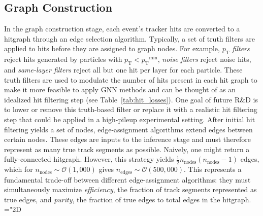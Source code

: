 \documentclass[twocolumn]{svjour3}
\newcommand{\pt}{\ensuremath{p_{\mathrm{T}}}\xspace}
\newcommand{\nnodes}{\ensuremath{n_\mathrm{nodes}\xspace}}
\newcommand{\nedges}{\ensuremath{n_\mathrm{edges}\xspace}}
\begin{document}
\subsection{Graph Construction}
\label{sec:Graph}
In the graph construction stage, each event's tracker hits are converted to a hitgraph through an edge selection algorithm. 
Typically, a set of truth filters are applied to hits before they are assigned to graph nodes. 
For example, \textit{$\pt$ filters} reject hits generated by particles with $\pt<\pt^\mathrm{min}$, \textit{noise filters} reject noise hits, and \textit{same-layer filters} reject all but one hit per layer for each particle. 
These truth filters are used to modulate the number of hits present in each hit graph to make it more feasible to apply GNN methods and can be thought of as an idealized hit filtering step (see Table~\ref{tab:hit_losses}).
One goal of future R\&D is to lower or remove this truth-based filter or replace it with a realistic hit filtering step that could be applied in a high-pileup experimental setting.
After initial hit filtering yields a set of nodes, edge-assignment algorithms extend edges between certain nodes. 
These edges are inputs to the inference stage and must therefore represent as many true track segments as possible. 
Naively, one might return a fully-connected hitgraph. 
However, this strategy yields $\frac{1}{2}\nnodes(\nnodes-1)$ edges, which for $\nnodes\sim\mathcal{O}(1,000)$ gives $\nedges\sim\mathcal{O}(500,000)$. 
This represents  a fundamental trade-off between different edge-assignment algorithms: they must simultaneously maximize \textit{efficiency}, the fraction of track segments represented as true edges, and \textit{purity}, the fraction of true edges to total edges in the hitgraph.
\mathchardef\mhyphen="2D
\end{document}
